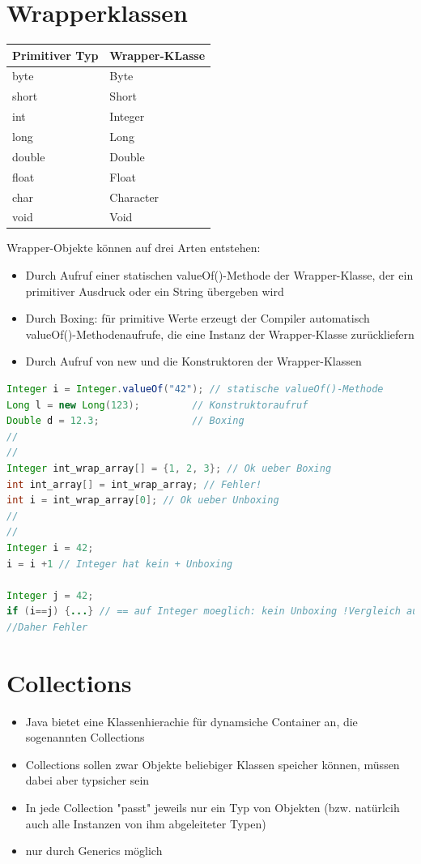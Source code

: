 \section{Wrapperklassen}
\begin{tabular}{|l|l|}
\textbf{Primitiver Typ} & \textbf{Wrapper-KLasse}\\\hline
byte & Byte \\\hline
short & Short \\\hline
int & Integer \\\hline
long & Long \\\hline
double & Double \\\hline
float & Float \\\hline
char & Character \\\hline
void & Void \\\hline
\end{tabular}
Wrapper-Objekte können auf drei Arten entstehen:
\begin{itemize}
\item Durch Aufruf einer statischen valueOf()-Methode der Wrapper-Klasse, der ein primitiver Ausdruck oder ein String übergeben wird
\item Durch Boxing: für primitive Werte erzeugt der Compiler automatisch valueOf()-Methodenaufrufe, die eine Instanz der Wrapper-Klasse zurückliefern
\item Durch Aufruf von new und die Konstruktoren der Wrapper-Klassen
\end{itemize}

\begin{lstlisting}[language=JAVA]
Integer i = Integer.valueOf("42"); // statische valueOf()-Methode
Long l = new Long(123); 		// Konstruktoraufruf
Double d = 12.3;				// Boxing
//
//
Integer int_wrap_array[] = {1, 2, 3}; // Ok ueber Boxing
int int_array[] = int_wrap_array; // Fehler!
int i = int_wrap_array[0]; // Ok ueber Unboxing
//
//
Integer i = 42;
i = i +1 // Integer hat kein + Unboxing

Integer j = 42;
if (i==j) {...} // == auf Integer moeglich: kein Unboxing !Vergleich auf Identitaet! 
//Daher Fehler
\end{lstlisting}
\section{Collections}
\begin{itemize}
\item Java bietet eine Klassenhierachie für dynamsiche Container an, die sogenannten Collections
\item Collections sollen zwar Objekte beliebiger Klassen speicher können, müssen dabei aber typsicher sein
\item In jede Collection "passt" jeweils nur ein Typ von Objekten (bzw. natürlcih auch alle Instanzen von ihm abgeleiteter Typen)
\item nur durch Generics möglich
\end{itemize}
